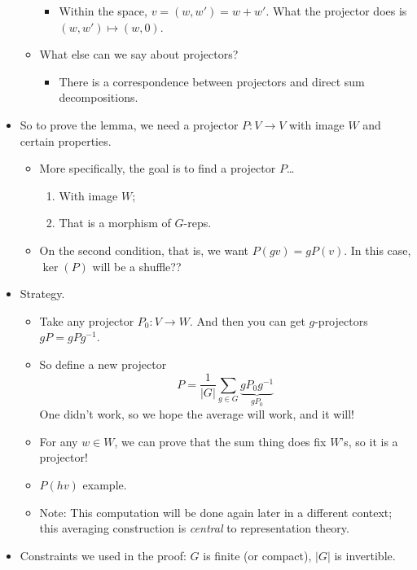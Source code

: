 \documentclass[../notes.tex]{subfiles}
\begin{document}
\begin{itemize}
\begin{itemize}
\begin{itemize}
            \item Within the space, $v=(w,w')=w+w'$. What the projector does is $(w,w')\mapsto(w,0)$.
        \end{itemize}
        \item What else can we say about projectors?
        \begin{itemize}
            \item There is a correspondence between projectors and direct sum decompositions.
        \end{itemize}
    \end{itemize}
    \item So to prove the lemma, we need a projector $P:V\to V$ with image $W$ and certain properties.
    \begin{itemize}
        \item More specifically, the goal is to find a projector $P$\dots
        \begin{enumerate}
            \item With image $W$;
            \item That is a morphism of $G$-reps.
        \end{enumerate}
        \item On the second condition, that is, we want $P(gv)=gP(v)$. In this case, $\ker(P)$ will be a shuffle??
    \end{itemize}
    \item Strategy.
    \begin{itemize}
        \item Take any projector $P_0:V\to W$. And then you can get $g$-projectors $gP=gPg^{-1}$.
        \item So define a new projector
        \begin{equation*}
            P = \frac{1}{|G|}\sum_{g\in G}\underbrace{gP_0g^{-1}}_{gP_0}
        \end{equation*}
        One didn't work, so we hope the average will work, and it will!
        \item For any $w\in W$, we can prove that the sum thing does fix $W$'s, so it is a projector!
        \item $P(hv)$ example.
        \item Note: This computation will be done again later in a different context; this averaging construction is \emph{central} to representation theory.
    \end{itemize}
    \item Constraints we used in the proof: $G$ is finite (or compact), $|G|$ is invertible.

\end{itemize}
\end{document}
